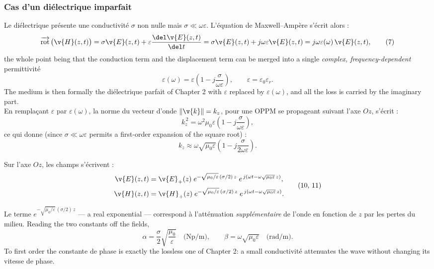 \subsubsection{Cas d'un diélectrique imparfait}

Le diélectrique présente une conductivité $\sigma$ non nulle mais $\sigma \ll
\omega\varepsilon$. L'équation de Maxwell--Ampère s'écrit alors :
\[
  \overrightarrow{\mathrm{rot}}\,\big(\v{H}(z,t)\big)
  = \sigma\v{E}(z,t) + \varepsilon\frac{\del \v{E}(z,t)}{\del t}
  = \sigma\v{E}(z,t) + j\omega\varepsilon\v{E}(z,t)
  = j\omega\varepsilon(\omega)\,\v{E}(z,t),
  \tag*{(7)}
\]
the whole point being that the conduction term and the displacement term can be
merged into a single \emph{complex, frequency-dependent} permittivité
\[
  \varepsilon(\omega) = \varepsilon\left(1 - j\frac{\sigma}{\omega\varepsilon}\right),
  \qquad \varepsilon = \varepsilon_0\varepsilon_r .
\]
The medium is then formally the diélectrique parfait of Chapter 2 with
$\varepsilon$ replaced by $\varepsilon(\omega)$, and all the loss is carried by
the imaginary part.\\

En remplaçant $\varepsilon$ par $\varepsilon(\omega)$, la norme du vecteur
d'onde $\|\v{k}\| = k_z$, pour une OPPM se propageant suivant l'axe $Oz$,
s'écrit :
\[
  k_z^{\,2} = \omega^2\mu_0\varepsilon\left(1 - j\frac{\sigma}{\omega\varepsilon}\right),
  \tag*{(8)}
\]
ce qui donne (since $\sigma \ll \omega\varepsilon$ permits a first-order
expansion of the square root) :
\[
  \boxed{\;k_z \approx \omega\sqrt{\mu_0\varepsilon}
    \left(1 - j\frac{\sigma}{2\omega\varepsilon}\right).\;}
  \tag*{(9)}
\]

Sur l'axe $Oz$, les champs s'écrivent :
\[
  \begin{aligned}
    \v{E}(z,t) &= \v{E}_+(z)\;
      e^{-\sqrt{\mu_0/\varepsilon}\,(\sigma/2)\,z}\;
      e^{\,j(\omega t - \omega\sqrt{\mu_0\varepsilon}\,z)}, \\[2pt]
    \v{H}(z,t) &= \v{H}_+(z)\;
      e^{-\sqrt{\mu_0/\varepsilon}\,(\sigma/2)\,z}\;
      e^{\,j(\omega t - \omega\sqrt{\mu_0\varepsilon}\,z)}.
  \end{aligned}
  \tag*{(10, 11)}
\]

\begin{conclusion}
  Le terme
  $e^{-\sqrt{\mu_0/\varepsilon}\,(\sigma/2)\,z}$ --- a real exponential ---
  correspond à l'atténuation \emph{supplémentaire} de l'onde en fonction de
  $z$ par les pertes du milieu. Reading the two constants off the fields,
  \[
    \alpha = \frac{\sigma}{2}\sqrt{\frac{\mu_0}{\varepsilon}}
    \quad\text{(Np/m)},
    \qquad
    \beta = \omega\sqrt{\mu_0\varepsilon}
    \quad\text{(rad/m)} .
  \]
  To first order the constante de phase is exactly the lossless one of
  Chapter 2: a small conductivité attenuates the wave without changing its
  vitesse de phase.
\end{conclusion}

